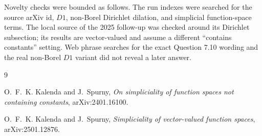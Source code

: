 \documentclass[11pt]{amsart}
\begin{document}
Novelty checks were bounded as follows.  The run indexes were searched for
the source arXiv id, \(D1\), non-Borel Dirichlet dilation, and simplicial
function-space terms.  The local source of the 2025 follow-up
\cite{KSvector} was checked around its Dirichlet subsection; its results are
vector-valued and assume a different ``contains constants'' setting.  Web
phrase searches for the exact Question 7.10 wording and the real non-Borel
\(D1\) variant did not reveal a later answer.

\begin{thebibliography}{9}

O.~F.~K. Kalenda and J.~Spurny,
\emph{On simpliciality of function spaces not containing constants},
arXiv:2401.16100.

O.~F.~K. Kalenda and J.~Spurny,
\emph{Simpliciality of vector-valued function spaces},
arXiv:2501.12876.

\end{thebibliography}
\end{document}
